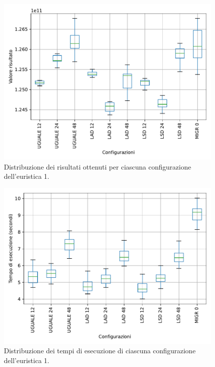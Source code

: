 \begin{figure}[t]
    \centering
    \includegraphics[scale=0.70]{img/grafico-e1-valore.pdf}
    \caption{Distribuzione dei risultati ottenuti per ciascuna configurazione dell'euristica 1.}
    \label{graf:e1-valore-range}
\end{figure}

\begin{figure}[t]
    \centering
    \includegraphics[scale=0.70]{img/grafico-e1-tempo.pdf}
    \caption{Distribuzione dei tempi di esecuzione di ciascuna configurazione dell'euristica 1.}
    \label{graf:e1-tempo-range}
\end{figure}

